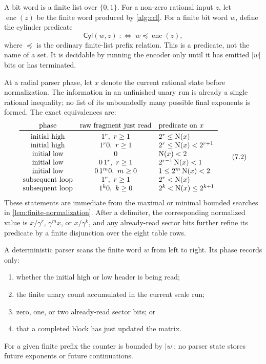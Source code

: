 \documentclass[10pt]{article}
\theoremstyle{definition}
\theoremstyle{remark}
\newcommand{\Norm}{\operatorname{N}}
\newcommand{\bits}{\{0,1\}}
\newcommand{\pref}{\preccurlyeq}
\newcommand{\Cyl}{\mathsf{Cyl}}
\begin{document}
A bit word is a finite list over $\bits$.  For a non-zero rational input $z$, let $\operatorname{enc}(z)$ be the finite word produced by \autoref{alg:ccl}.  For a finite bit word $w$, define the cylinder predicate
\[
 \Cyl(w,z)\;:\Longleftrightarrow\; w\pref\operatorname{enc}(z),
\tag{7.1}
\]
where $\pref$ is the ordinary finite-list prefix relation.  This is a predicate, not the name of a set.  It is decidable by running the encoder only until it has emitted $|w|$ bits or has terminated.

At a radial parser phase, let $x$ denote the current rational state before normalization.  The information in an unfinished unary run is already a single rational inequality; no list of its unboundedly many possible final exponents is formed.  The exact equivalences are:
\[
\begin{array}{ccl}
\text{phase}&\text{raw fragment just read}&\text{predicate on }x\\ \toprule
\text{initial high}&1^r,\ r\ge1&2^r\le\Norm(x)\\
\text{initial high}&1^r0,\ r\ge1&2^r\le\Norm(x)<2^{r+1}\\
\text{initial low}&0&\Norm(x)<2\\
\text{initial low}&0\,1^r,\ r\ge1&2^{r-1}\Norm(x)<1\\
\text{initial low}&0\,1^m0,\ m\ge0&1\le2^m\Norm(x)<2\\
\text{subsequent loop}&1^r,\ r\ge1&2^r<\Norm(x)\\
\text{subsequent loop}&1^k0,\ k\ge0&2^k<\Norm(x)\le2^{k+1}
\end{array}
\tag{7.2}
\]
These statements are immediate from the maximal or minimal bounded searches in \autoref{lem:finite-normalization}.  After a delimiter, the corresponding normalized value is $x/\gamma^r$, $\gamma^m x$, or $x/\gamma^k$, and any already-read sector bits further refine its predicate by a finite disjunction over the eight table rows.

A deterministic parser scans the finite word $w$ from left to right.  Its phase records only:
\begin{enumerate}[label=\textup{(\roman*)}]
\item whether the initial high or low header is being read;
\item the finite unary count accumulated in the current scale run;
\item zero, one, or two already-read sector bits; or
\item that a completed block has just updated the matrix.
\end{enumerate}
For a given finite prefix the counter is bounded by $|w|$; no parser state stores future exponents or future continuations.
\end{document}
